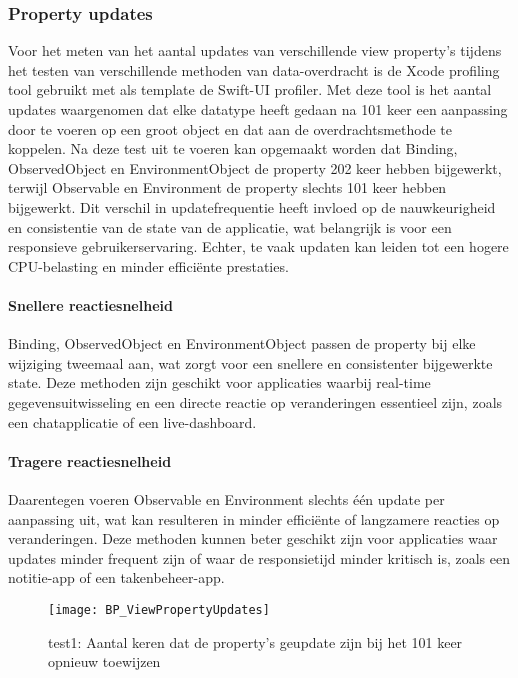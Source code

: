 \newpage
\subsubsection{Property updates}
Voor het meten van het aantal updates van verschillende view property's tijdens het testen van verschillende methoden van data-overdracht is de Xcode profiling tool gebruikt met als template de Swift-UI profiler. Met deze tool is het aantal updates waargenomen dat elke datatype heeft gedaan na 101 keer een aanpassing door te voeren op een groot object en dat aan de overdrachtsmethode te koppelen. Na deze test uit te voeren kan opgemaakt worden dat Binding, ObservedObject en EnvironmentObject de property 202 keer hebben bijgewerkt, terwijl Observable en Environment de property slechts 101 keer hebben bijgewerkt. Dit verschil in updatefrequentie heeft invloed op de nauwkeurigheid en consistentie van de state van de applicatie, wat belangrijk is voor een responsieve gebruikerservaring. Echter, te vaak updaten kan leiden tot een hogere CPU-belasting en minder efficiënte prestaties.

\paragraph{Snellere reactiesnelheid}
Binding, ObservedObject en EnvironmentObject passen de property bij elke wijziging tweemaal aan, wat zorgt voor een snellere en consistenter bijgewerkte state. Deze methoden zijn geschikt voor applicaties waarbij real-time gegevensuitwisseling en een directe reactie op veranderingen essentieel zijn, zoals een chatapplicatie of een live-dashboard.

\paragraph{Tragere reactiesnelheid}
Daarentegen voeren Observable en Environment slechts één update per aanpassing uit, wat kan resulteren in minder efficiënte of langzamere reacties op veranderingen. Deze methoden kunnen beter geschikt zijn voor applicaties waar updates minder frequent zijn of waar de responsietijd minder kritisch is, zoals een notitie-app of een takenbeheer-app.


\begin{figure}[htbp]
    \centering
    \texttt{[image: BP\_ViewPropertyUpdates]} 
    \caption{test1: Aantal keren dat de property's geupdate zijn bij het 101 keer opnieuw toewijzen}
    \label{fig:propertyUpdates}
\end{figure}

